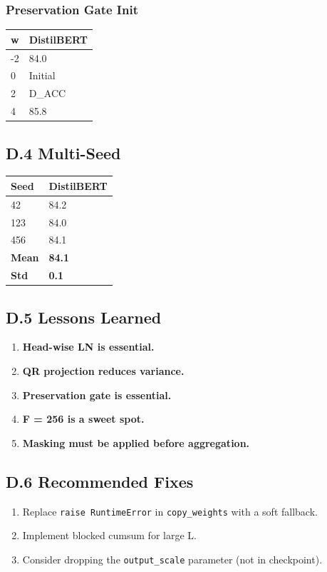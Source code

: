 \subsubsection{Preservation Gate Init}

\begin{table}[H]
\centering
\small
\begin{tabular}{ll}
\toprule
\textbf{w} & \textbf{DistilBERT} \\
\midrule
-2 & 84.0 \\
0 & Initial \\
2 & {{D\_ACC}} \\
4 & 85.8 \\
\bottomrule
\end{tabular}
\end{table}

\subsection{D.4 Multi-Seed}

\begin{table}[H]
\centering
\small
\begin{tabular}{ll}
\toprule
\textbf{Seed} & \textbf{DistilBERT} \\
\midrule
42 & 84.2 \\
123 & 84.0 \\
456 & 84.1 \\
\textbf{Mean} & \textbf{84.1} \\
\textbf{Std} & \textbf{0.1} \\
\bottomrule
\end{tabular}
\end{table}

\subsection{D.5 Lessons Learned}

\begin{enumerate}
\item \textbf{Head-wise LN is essential.}
\item \textbf{QR projection reduces variance.}
\item \textbf{Preservation gate is essential.}
\item \textbf{F = 256 is a sweet spot.}
\item \textbf{Masking must be applied before aggregation.}

\end{enumerate}
\subsection{D.6 Recommended Fixes}

\begin{enumerate}
\item Replace \texttt{raise RuntimeError} in \texttt{copy\_weights} with a soft fallback.
\item Implement blocked cumsum for large L.
\item Consider dropping the \texttt{output\_scale} parameter (not in checkpoint).

\end{enumerate}
